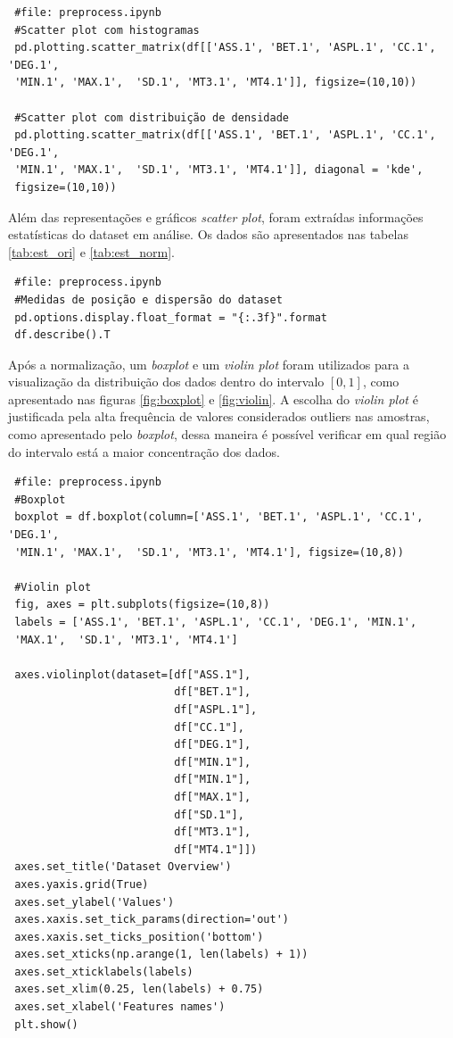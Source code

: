 \documentclass[
	article,			%
	11pt,				%
	oneside,			%
	a4paper,			%
	english,			%
	brazil,				%
	sumario=tradicional
	]{abntex2}
\begin{document}
\begin{verbatim}
 #file: preprocess.ipynb
 #Scatter plot com histogramas
 pd.plotting.scatter_matrix(df[['ASS.1', 'BET.1', 'ASPL.1', 'CC.1', 'DEG.1',
 'MIN.1', 'MAX.1',  'SD.1', 'MT3.1', 'MT4.1']], figsize=(10,10))
 
 #Scatter plot com distribuição de densidade
 pd.plotting.scatter_matrix(df[['ASS.1', 'BET.1', 'ASPL.1', 'CC.1', 'DEG.1',
 'MIN.1', 'MAX.1',  'SD.1', 'MT3.1', 'MT4.1']], diagonal = 'kde',
 figsize=(10,10))
\end{verbatim}

Além das representações e gráficos \textit{scatter plot}, foram extraídas informações estatísticas do dataset em análise. Os dados são apresentados nas tabelas \ref{tab:est_ori} e \ref{tab:est_norm}.

\begin{verbatim}
 #file: preprocess.ipynb
 #Medidas de posição e dispersão do dataset
 pd.options.display.float_format = "{:.3f}".format
 df.describe().T
\end{verbatim}


Após a normalização, um \textit{boxplot} e um \textit{violin plot} foram utilizados para a visualização da distribuição dos dados dentro do intervalo $[0,1]$, como apresentado nas figuras \ref{fig:boxplot} e \ref{fig:violin}. A escolha do \textit{violin plot} é justificada pela alta frequência de valores considerados outliers nas amostras, como apresentado pelo \textit{boxplot}, dessa maneira é possível verificar em qual região do intervalo está a maior concentração dos dados.

\begin{verbatim}
 #file: preprocess.ipynb
 #Boxplot
 boxplot = df.boxplot(column=['ASS.1', 'BET.1', 'ASPL.1', 'CC.1', 'DEG.1',
 'MIN.1', 'MAX.1',  'SD.1', 'MT3.1', 'MT4.1'], figsize=(10,8))
 
 #Violin plot
 fig, axes = plt.subplots(figsize=(10,8))
 labels = ['ASS.1', 'BET.1', 'ASPL.1', 'CC.1', 'DEG.1', 'MIN.1',
 'MAX.1',  'SD.1', 'MT3.1', 'MT4.1']

 axes.violinplot(dataset=[df["ASS.1"],
                          df["BET.1"],
                          df["ASPL.1"],
                          df["CC.1"],
                          df["DEG.1"],
                          df["MIN.1"],
                          df["MIN.1"],
                          df["MAX.1"],
                          df["SD.1"],
                          df["MT3.1"],
                          df["MT4.1"]])
 axes.set_title('Dataset Overview')
 axes.yaxis.grid(True)
 axes.set_ylabel('Values')
 axes.xaxis.set_tick_params(direction='out')
 axes.xaxis.set_ticks_position('bottom')
 axes.set_xticks(np.arange(1, len(labels) + 1))
 axes.set_xticklabels(labels)
 axes.set_xlim(0.25, len(labels) + 0.75)
 axes.set_xlabel('Features names')
 plt.show()
\end{verbatim}
\end{document}
